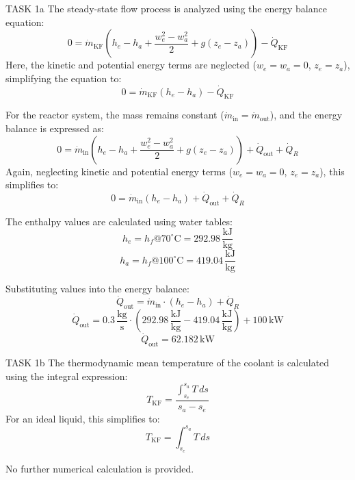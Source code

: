 TASK 1a  
The steady-state flow process is analyzed using the energy balance equation:  
\[
0 = \dot{m}_{\text{KF}} \left( h_e - h_a + \frac{w_e^2 - w_a^2}{2} + g(z_e - z_a) \right) - \dot{Q}_{\text{KF}}
\]  
Here, the kinetic and potential energy terms are neglected (\( w_e = w_a = 0 \), \( z_e = z_a \)), simplifying the equation to:  
\[
0 = \dot{m}_{\text{KF}} (h_e - h_a) - \dot{Q}_{\text{KF}}
\]  

For the reactor system, the mass remains constant (\( \dot{m}_{\text{in}} = \dot{m}_{\text{out}} \)), and the energy balance is expressed as:  
\[
0 = \dot{m}_{\text{in}} \left( h_e - h_a + \frac{w_e^2 - w_a^2}{2} + g(z_e - z_a) \right) + \dot{Q}_{\text{out}} + \dot{Q}_R
\]  
Again, neglecting kinetic and potential energy terms (\( w_e = w_a = 0 \), \( z_e = z_a \)), this simplifies to:  
\[
0 = \dot{m}_{\text{in}} (h_e - h_a) + \dot{Q}_{\text{out}} + \dot{Q}_R
\]  

The enthalpy values are calculated using water tables:  
\[
h_e = h_f @ 70^\circ\text{C} = 292.98 \, \frac{\text{kJ}}{\text{kg}}
\]  
\[
h_a = h_f @ 100^\circ\text{C} = 419.04 \, \frac{\text{kJ}}{\text{kg}}
\]  

Substituting values into the energy balance:  
\[
\dot{Q}_{\text{out}} = \dot{m}_{\text{in}} \cdot (h_e - h_a) + \dot{Q}_R
\]  
\[
\dot{Q}_{\text{out}} = 0.3 \, \frac{\text{kg}}{\text{s}} \cdot (292.98 \, \frac{\text{kJ}}{\text{kg}} - 419.04 \, \frac{\text{kJ}}{\text{kg}}) + 100 \, \text{kW}
\]  
\[
\dot{Q}_{\text{out}} = 62.182 \, \text{kW}
\]  

TASK 1b  
The thermodynamic mean temperature of the coolant is calculated using the integral expression:  
\[
T_{\text{KF}} = \frac{\int_{s_e}^{s_a} T \, ds}{s_a - s_e}
\]  
For an ideal liquid, this simplifies to:  
\[
T_{\text{KF}} = \int_{s_e}^{s_a} T \, ds
\]  

No further numerical calculation is provided.